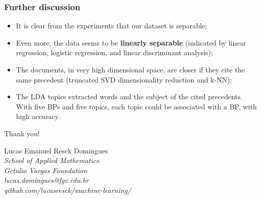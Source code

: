 \documentclass{beamer}
\begin{document}
    \begin{frame}
        \frametitle{Further discussion}

        \begin{itemize}
            \item It is clear from the experiments that our dataset is separable; \pause
            \item Even more, the data seems to be \textbf{linearly separable} (indicated by linear regression, logistic regression, and linear discriminant analysis); \pause
            \item The documents, in very high dimensional space, are closer if they cite the same precedent (truncated SVD dimensionality reduction and k-NN); \pause
            \item The LDA topics extracted words and the subject of the cited precedents. With five BPs and five topics, each topic could be associated with a BP, with high accuracy.
        \end{itemize}
    \end{frame}

    \begin{frame}
        \begin{center}
        {\Huge Thank you!}
        \bigskip

        Lucas Emanuel Resck Domingues \\
        \textit{School of Applied Mathematics} \\
        \textit{Getulio Vargas Foundation} \\
        \textit{lucas.domingues@fgv.edu.br} \\
        \textit{github.com/lucasresck/machine-learning/}
        \end{center}
    \end{frame}

    \nocite{*}
    
    
\end{document}
